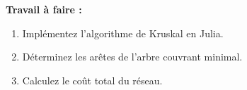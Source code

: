 \textbf{Travail à faire :}
\begin{enumerate}
    \item Implémentez l’algorithme de Kruskal en Julia.
    \item Déterminez les arêtes de l’arbre couvrant minimal.
    \item Calculez le coût total du réseau.
\end{enumerate}

